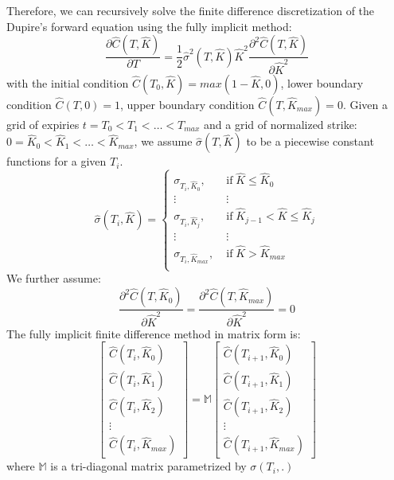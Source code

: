 \documentclass[letterpaper,12pt,titlepage,oneside,final]{book}
\numberwithin{equation}{section}
\theoremstyle{definition}
\begin{document}
Therefore, we can recursively solve the finite difference  discretization of the Dupire's forward equation using the fully implicit method:
\[
\frac{\partial \widehat{C}(T,\widehat{K})}{\partial T}=\frac{1}{2} \widehat{\sigma}^2(T,\widehat{K}) \widehat{K}^2  \frac{\partial^2 \widehat{C}(T,\widehat{K})}{ \partial \widehat{K}^2}
\]
with the initial condition $\widehat{C}(T_0,\widehat{K})=max(1-\widehat{K},0)$, lower boundary condition $\widehat{C}(T,0)=1$, upper boundary condition $\widehat{C}(T,\widehat{K}_{max})=0$.
Given a grid of expiries $t=T_0 < T_1 < \dots< T_{max} $ and  a grid of normalized strike: $0=\widehat{K}_0<\widehat{K}_1<\dots<\widehat{K}_{max}$, we assume $\widehat{\sigma}(T,\widehat{K})$  to be a piecewise constant functions for a given $T_i$.
\[
	\widehat{\sigma}(T_i,\widehat{K})=\left\{ \begin{array}{ll}
		\sigma_{T_i,\widehat{K}_0}  , \; &\text{if} \; \widehat{K} \leq \widehat{K}_0\\
		\vdots & \vdots\\
		\sigma_{T_i,\widehat{K}_j}  , \; &\text{if} \; \widehat{K}_{j-1}<\widehat{K} \leq \widehat{K}_j\\
		\vdots & \vdots\\
		\sigma_{T_i,\widehat{K}_{max}} , \; &\text{if} \;  \widehat{K} > \widehat{K}_{max} \\
		\end{array} \right.
\]
We further assume:
\[
 \frac{\partial^2 \widehat{C}(T,\widehat{K}_0)}{ \partial \widehat{K}^2}=\frac{\partial^2 \widehat{C}(T,\widehat{K}_{max})}{ \partial \widehat{K}^2}=0
\]
The fully implicit finite difference method in matrix form is:
\[\begin{bmatrix}
\widehat{C}(T_{i},\widehat{K}_0)\\
\widehat{C}(T_{i},\widehat{K}_1)\\
\widehat{C}(T_{i},\widehat{K}_2)\\
\vdots\\
\widehat{C}(T_{i},\widehat{K}_{max})
\end{bmatrix}=\mathcal{\mathbb{M}}
\begin{bmatrix}
\widehat{C}(T_{i+1},\widehat{K}_0)\\
\widehat{C}(T_{i+1},\widehat{K}_1)\\
\widehat{C}(T_{i+1},\widehat{K}_2)\\
\vdots\\
\widehat{C}(T_{i+1},\widehat{K}_{max})
\end{bmatrix}
\]
where $\mathcal{\mathbb{M}}$ is a tri-diagonal matrix parametrized by  $\sigma(T_i,.)$
\end{document}

